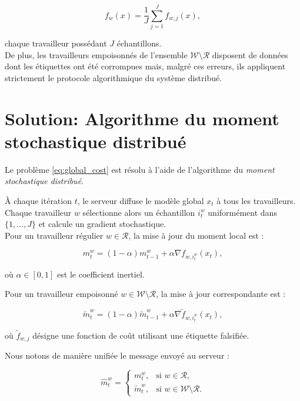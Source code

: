 \documentclass{article}
\begin{document}
\begin{equation}
    f_w(x) = \frac{1}{J} \sum_{j=1}^{J} f_{w,j}(x),
\end{equation}

chaque travailleur possédant $J$ échantillons.\\ 

De plus, les travailleurs empoisonnés de l'ensemble $\mathcal W \setminus \mathcal R$ disposent de données dont les étiquettes ont été corrompues mais, malgré ces erreurs, ils appliquent strictement le protocole algorithmique du système distribué.

\section*{Solution: Algorithme du moment stochastique distribué}

Le problème \eqref{eq:global_cost} est résolu à l'aide de l'algorithme du \emph{moment stochastique distribué}.

À chaque itération $t$, le serveur diffuse le modèle global $x_t$ à tous les travailleurs.  
Chaque travailleur $w$ sélectionne alors un échantillon $i_t^w$ uniformément dans $\{1,\dots,J\}$ et
calcule un gradient stochastique. \\

Pour un travailleur régulier $w \in \mathcal{R}$, la mise à jour du moment local est :

\begin{equation}
    m_t^{w} = (1 - \alpha) m_{t-1}^{w}
    + \alpha \nabla f_{w, i_t^w}(x_t),
\end{equation}

où $\alpha \in [0,1]$ est le coefficient inertiel.

Pour un travailleur empoisonné $w \in \mathcal{W} \setminus \mathcal{R}$, la mise à jour correspondante est :

\begin{equation}
    \tilde{m}_t^{w} = (1 - \alpha) \tilde{m}_{t-1}^{w}
    + \alpha \nabla \tilde{f}_{w, i_t^w}(x_t),
\end{equation}

où $\tilde{f}_{w,j}$ désigne une fonction de coût utilisant une étiquette falsifiée.

Nous notons de manière unifiée le message envoyé au serveur :

\begin{equation}
    \hat{m}_t^{w} =
    \begin{cases}
        m_t^{w}, & \text{si } w \in \mathcal{R}, \\
        \tilde{m}_t^{w}, & \text{si } w \in \mathcal{W} \setminus \mathcal{R}.
    \end{cases}
\end{equation}
\end{document}
